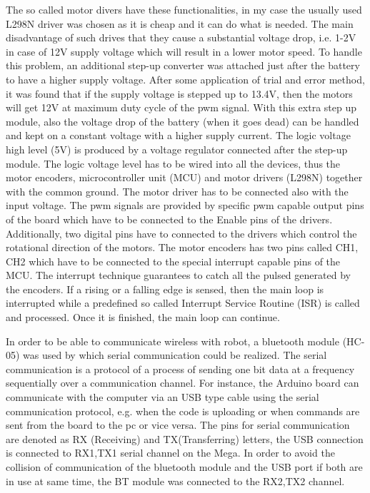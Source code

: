 \documentclass[12pt,english,twoside]{article}
\begin{document}
The so called motor divers have these functionalities, in my case the usually used L298N driver was chosen as it is cheap and it can do what is needed. The main disadvantage of such drives that they cause a substantial voltage drop, i.e. 1-2V in case of 12V supply voltage which will result in a lower motor speed. To handle this problem, an additional step-up converter was attached just after the battery to have a higher supply voltage. After some  application of trial and error method, it was found that if the supply voltage is stepped up to 13.4V, then the motors will get 12V at maximum duty cycle of the pwm signal. With this extra step up module, also the voltage drop of the battery (when it goes dead) can be handled and kept on a constant voltage with a higher supply current. The logic voltage high level (5V) is produced by a voltage regulator connected after the step-up module. The logic voltage level has to be wired into all the devices, thus the motor encoders, microcontroller unit (MCU) and motor drivers (L298N) together with the common ground. The motor driver has to be connected also with the input voltage. The pwm signals are provided by specific pwm capable output pins of the board which have to be connected to the Enable pins of the drivers. Additionally, two digital pins have to connected to the drivers which control the rotational direction of the motors. The motor encoders has two pins called CH1, CH2 which have to be connected to the special interrupt capable pins of the MCU. The interrupt technique guarantees to catch all the pulsed generated by the encoders. If a rising or a falling edge is sensed, then the main loop is interrupted while a predefined so called Interrupt Service Routine (ISR) is called and processed. Once it is finished, the main loop can continue. 

In order to be able to communicate wireless with robot, a bluetooth module (HC-05) was used by which serial communication could be realized. The serial communication is a protocol of a process of sending one bit data at a frequency sequentially over a communication channel. For instance, the Arduino board can communicate with the computer via an USB type cable using the serial communication protocol, e.g. when the code is uploading or when commands are sent from the board to the pc or vice versa. The pins for serial communication are denoted as RX (Receiving) and TX(Transferring) letters, the USB connection is connected to RX1,TX1 serial channel on the Mega. In order to avoid the collision of communication of the bluetooth module and the USB port if both are in use at same time, the BT module was connected to the RX2,TX2 channel.
\end{document}
